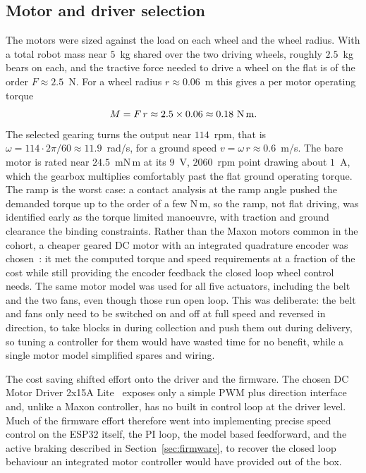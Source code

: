 \documentclass[11pt]{article}
\begin{document}
\subsection{Motor and driver selection}
The motors were sized against the load on each wheel and the wheel radius. With a total robot mass near $5$~kg shared over the two driving wheels, roughly $2.5$~kg bears on each, and the tractive force needed to drive a wheel on the flat is of the order $F \approx 2.5$~N. For a wheel radius $r \approx 0.06$~m this gives a per motor operating torque
\begin{equation*}
M = F\,r \approx 2.5 \times 0.06 \approx 0.18~\text{N\,m}.
\end{equation*}
The selected gearing turns the output near $114$~rpm, that is $\omega = 114 \cdot 2\pi/60 \approx 11.9$~rad/s, for a ground speed $v = \omega\,r \approx 0.6$~m/s. The bare motor is rated near $24.5$~mN\,m at its $9$~V, $2060$~rpm point drawing about $1$~A, which the gearbox multiplies comfortably past the flat ground operating torque. The ramp is the worst case: a contact analysis at the ramp angle pushed the demanded torque up to the order of a few N\,m, so the ramp, not flat driving, was identified early as the torque limited manoeuvre, with traction and ground clearance the binding constraints. Rather than the Maxon motors common in the cohort, a cheaper geared DC motor with an integrated quadrature encoder was chosen~\cite{dfrobotmotor}: it met the computed torque and speed requirements at a fraction of the cost while still providing the encoder feedback the closed loop wheel control needs. The same motor model was used for all five actuators, including the belt and the two fans, even though those run open loop. This was deliberate: the belt and fans only need to be switched on and off at full speed and reversed in direction, to take blocks in during collection and push them out during delivery, so tuning a controller for them would have wasted time for no benefit, while a single motor model simplified spares and wiring.

The cost saving shifted effort onto the driver and the firmware. The chosen DC Motor Driver 2x15A Lite~\cite{dfrobotdriver} exposes only a simple PWM plus direction interface and, unlike a Maxon controller, has no built in control loop at the driver level. Much of the firmware effort therefore went into implementing precise speed control on the ESP32 itself, the PI loop, the model based feedforward, and the active braking described in Section~\ref{sec:firmware}, to recover the closed loop behaviour an integrated motor controller would have provided out of the box.
\end{document}
